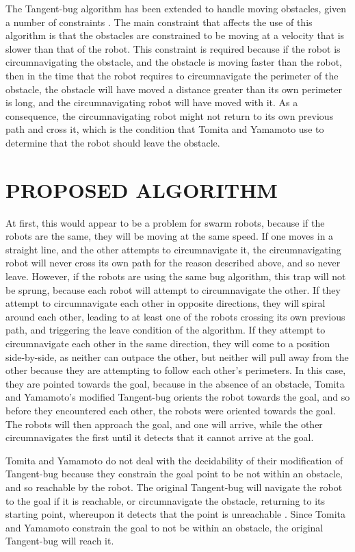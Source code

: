 \documentclass[letterpaper, 10 pt, conference]{ieeeconf}  %
\begin{document}
The Tangent-bug algorithm has been extended to handle moving obstacles, given a number of constraints \cite{tomita2009sensor}.
The main constraint that affects the use of this algorithm is that the obstacles are constrained to be moving at a velocity that is slower than that of the robot.
This constraint is required because if the robot is circumnavigating the obstacle, and the obstacle is moving faster than the robot, then in the time that the robot requires to circumnavigate the perimeter of the obstacle, the obstacle will have moved a distance greater than its own perimeter is long, and the circumnavigating robot will have moved with it.
As a consequence, the circumnavigating robot might not return to its own previous path and cross it, which is the condition that Tomita and Yamamoto use to determine that the robot should leave the obstacle. 

\section {PROPOSED ALGORITHM}
At first, this would appear to be a problem for swarm robots, because if the robots are the same, they will be moving at the same speed. 
If one moves in a straight line, and the other attempts to circumnavigate it, the circumnavigating robot will never cross its own path for the reason described above, and so never leave. 
However, if the robots are using the same bug algorithm, this trap will not be sprung, because each robot will attempt to circumnavigate the other. 
If they attempt to circumnavigate each other in opposite directions, they will spiral around each other, leading to at least one of the robots crossing its own previous path, and triggering the leave condition of the algorithm. 
If they attempt to circumnavigate each other in the same direction, they will come to a position side-by-side, as neither can outpace the other, but neither will pull away from the other because they are attempting to follow each other's perimeters. 
In this case, they are pointed towards the goal, because in the absence of an obstacle, Tomita and Yamamoto's modified Tangent-bug orients the robot towards the goal, and so before they encountered each other, the robots were oriented towards the goal.
The robots will then approach the goal, and one will arrive, while the other circumnavigates the first until it detects that it cannot arrive at the goal. 

Tomita and Yamamoto do not deal with the decidability of their modification of Tangent-bug because they constrain the goal point to be not within an obstacle, and so reachable by the robot. The original Tangent-bug will navigate the robot to the goal if it is reachable, or circumnavigate the obstacle, returning to its starting point, whereupon it detects that the point is unreachable \cite{kamon1998tangentbug}. Since Tomita and Yamamoto constrain the goal to not be within an obstacle, the original Tangent-bug will reach it. 
\end{document}
